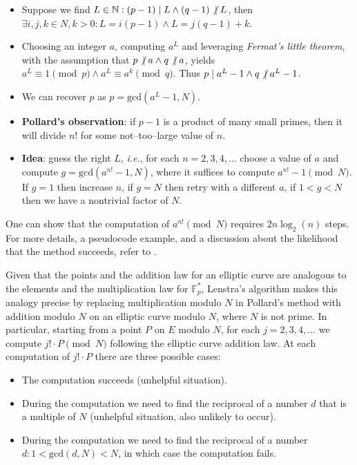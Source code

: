 \documentclass[9pt]{article}
\theoremstyle{definition}
\begin{document}
\begin{itemize}
    \item Suppose we find $L \in \mathbb{N} : (p-1) \mid L \wedge (q-1) \not\hspace{2.5pt}\mid L$, then $\exists i,j,k \in N, k > 0 : L = i(p-1) \wedge L = j(q-1) + k$.
    \item Choosing an integer $a$, computing $a^L$ and leveraging \textit{Fermat's little theorem}, with the assumption that $p \not\hspace{2.5pt}\mid a \wedge q \not\hspace{2.5pt}\mid a$, yields $a^L \equiv 1 \pmod{p} \wedge a^L \equiv a^k \pmod{q}$. Thus $p \mid a^L - 1 \wedge q \not\hspace{2.5pt}\mid a^L - 1$.
    \item We can recover $p$ as $p = \text{gcd}(a^L - 1,N)$.
    \item \textbf{Pollard's observation}: if $p - 1$ is a product of many small primes, then it will divide $n!$ for some not--too--large value of $n$.
    \item \textbf{Idea}: guess the right $L$, \textit{i.e.}, for each $n = 2,3,4,...$ choose a value of $a$ and compute $g = \text{gcd}(a^{n!} - 1, N)$, where it suffices to compute $a^{n!} - 1 \pmod{N}$. If $g = 1$ then increase $n$, if $g = N$ then retry with a different $a$, if $1 < g < N$ then we have a nontrivial factor of $N$.
\end{itemize}

One can show that the computation of $a^{n!} \pmod{N}$ requires $2n \log_2(n)$ steps. For more details, a pseudocode example, and a discussion about the likelihood that the method succeeds, refer to \cite[Section~5.6]{JH08}.

Given that the points and the addition law for an elliptic curve are analogous to the elements and the multiplication law for $\mathbb{F}_p^\ast$, Lenstra's algorithm makes this analogy precise by replacing multiplication modulo $N$ in Pollard's method with addition modulo $N$ on an elliptic curve modulo $N$, where $N$ is not prime. In particular, starting from a point $P$ on $E$ modulo $N$, for each $j = 2,3,4,...$ we compute $j!\cdot P \pmod{N}$ following the elliptic curve addition law. At each computation of $j!\cdot P$ there are three possible cases:
\begin{itemize}
    \item The computation succeeds (unhelpful situation).
    \item During the computation we need to find the reciprocal of a number $d$ that is a multiple of $N$ (unhelpful situation, also unlikely to occur).
    \item During the computation we need to find the reciprocal of a number $d : 1 < \text{gcd}(d,N) < N$, in which case the computation fails.
\end{itemize}
\end{document}
